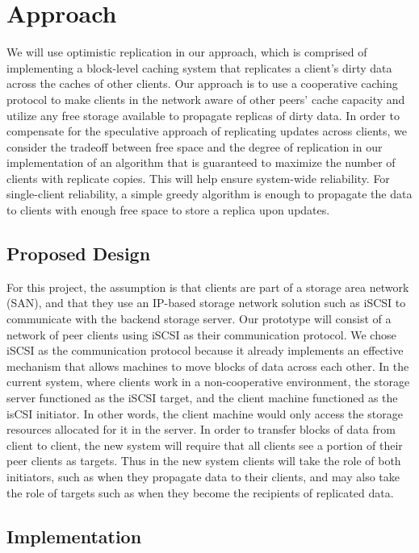 \section{Approach}

We will use optimistic replication in our approach, which is comprised of implementing a block-level caching system that replicates a client's dirty data across the caches of other clients. Our approach is to use a cooperative caching protocol to make clients in the network aware of other peers' cache capacity and utilize any free storage available to propagate replicas of dirty data. In order to compensate for the speculative approach of replicating updates across clients, we consider the tradeoff between free space and the degree of replication in our implementation of an algorithm that is guaranteed to maximize the number of clients with replicate copies. This will help ensure system-wide reliability. For single-client reliability, a simple greedy algorithm is enough to propagate the data to clients with enough free space to store a replica upon updates.

\subsection{Proposed Design}

For this project, the assumption is that clients are part of a storage area network (SAN), and that they use an IP-based storage network solution such as iSCSI to communicate with the backend storage server. Our prototype will consist of a network of peer clients using iSCSI as their communication protocol. We chose iSCSI as the communication protocol because it already implements an effective mechanism that allows machines to move blocks of data across each other. In the current system, where clients work in a non-cooperative environment, the storage server functioned as the iSCSI target, and the client machine functioned as the isCSI initiator. In other words, the client machine would only access the storage resources allocated for it in the server. In order to transfer blocks of data from client to client, the new system will require that all clients see a portion of their peer clients as targets. Thus in the new system clients will take the role of both initiators, such as when they propagate data to their clients, and may also take the role of targets such as when they become the recipients of replicated data.

\subsection{Implementation}

